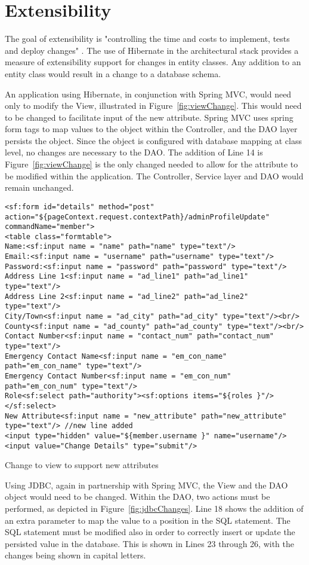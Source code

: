 \section{Extensibility}

The goal of extensibility is "controlling the time and costs to implement, tests and deploy changes" \parencite{bass2003software}. The use of Hibernate in the architectural stack provides a measure of extensibility support for changes in entity classes. Any addition to an entity class would result in a change to a database schema. 

An application using Hibernate, in conjunction with Spring MVC, would need only to modify the View, illustrated in Figure~\ref{fig:viewChange}. This would need to be changed to facilitate input of the new attribute. Spring MVC uses spring form tags to map values to the object within the Controller, and the DAO layer persists the object. Since the object is configured with database mapping at class level, no changes are necessary to the DAO. The addition of Line 14 is Figure~\ref{fig:viewChange} is the only changed needed to allow for the attribute to be modified within the application. The Controller, Service layer and DAO would remain unchanged.

\begin{table}[H]
\begin{lstlisting}
<sf:form id="details" method="post" action="${pageContext.request.contextPath}/adminProfileUpdate" commandName="member">
<table class="formtable">
Name:<sf:input name = "name" path="name" type="text"/>
Email:<sf:input name = "username" path="username" type="text"/>
Password:<sf:input name = "password" path="password" type="text"/>
Address Line 1<sf:input name = "ad_line1" path="ad_line1" type="text"/>
Address Line 2<sf:input name = "ad_line2" path="ad_line2" type="text"/>
City/Town<sf:input name = "ad_city" path="ad_city" type="text"/><br/>
County<sf:input name = "ad_county" path="ad_county" type="text"/><br/>
Contact Number<sf:input name = "contact_num" path="contact_num" type="text"/>
Emergency Contact Name<sf:input name = "em_con_name" path="em_con_name" type="text"/>
Emergency Contact Number<sf:input name = "em_con_num" path="em_con_num" type="text"/>
Role<sf:select path="authority"><sf:options items="${roles }"/></sf:select>
New Attribute<sf:input name = "new_attribute" path="new_attribute" type="text"/> //new line added
<input type="hidden" value="${member.username }" name="username"/>
<input value="Change Details" type="submit"/>
\end{lstlisting}
\caption{Change to view to support new attributes}
\label{fig:viewChange}
\end{table}
Using JDBC, again in partnership with Spring MVC, the View and the DAO object would need to be changed. Within the DAO, two actions must be performed, as depicted in Figure~\ref{fig:jdbcChanges}. Line 18 shows the addition of an extra parameter to map the value to a position in the SQL statement. The SQL statement must be modified also in order to correctly insert or update the persisted value in the database. This is shown in Lines 23 through 26, with the changes being shown in capital letters. 

